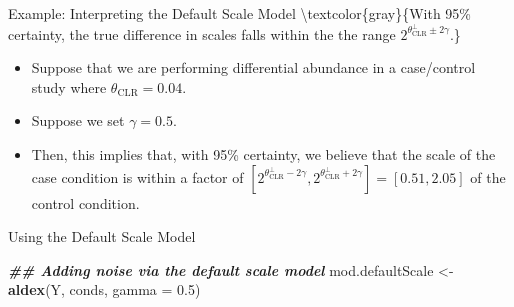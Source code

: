 \documentclass[
  ignorenonframetext,
]{beamer}
\newenvironment{Shaded}{\begin{snugshade}}{\end{snugshade}}
\newcommand{\AttributeTok}[1]{\textcolor[rgb]{0.13,0.29,0.53}{#1}}
\newcommand{\DocumentationTok}[1]{\textcolor[rgb]{0.56,0.35,0.01}{\textbf{\textit{#1}}}}
\newcommand{\FloatTok}[1]{\textcolor[rgb]{0.00,0.00,0.81}{#1}}
\newcommand{\FunctionTok}[1]{\textcolor[rgb]{0.13,0.29,0.53}{\textbf{#1}}}
\newcommand{\NormalTok}[1]{#1}
\newcommand{\OtherTok}[1]{\textcolor[rgb]{0.56,0.35,0.01}{#1}}
\providecommand{\tightlist}{%
  \setlength{\itemsep}{0pt}\setlength{\parskip}{0pt}}
\begin{document}
\begin{frame}{Example: Interpreting the Default Scale Model}
\protect\hypertarget{example-interpreting-the-default-scale-model}{}
\textbackslash textcolor\{gray\}\{With 95\% certainty, the true
difference in scales falls within the the range
\(2^{\theta_{\text{CLR}}^\perp \pm 2 \gamma}\).\}

\pause

\begin{itemize}
\tightlist
\item
  Suppose that we are performing differential abundance in a
  case/control study where \(\theta_{\text{CLR}} = 0.04\).
\end{itemize}

\pause

\begin{itemize}
\tightlist
\item
  Suppose we set \(\gamma = 0.5\).
\end{itemize}

\pause

\begin{itemize}
\tightlist
\item
  Then, this implies that, with 95\% certainty, we believe that the
  scale of the case condition is within a factor of
  \([2^{\theta_{\text{CLR}}^\perp - 2 \gamma}, 2^{\theta_{\text{CLR}}^\perp + 2 \gamma}] = [0.51,2.05]\)
  of the control condition.
\end{itemize}
\end{frame}

\begin{frame}[fragile]{Using the Default Scale Model}
\protect\hypertarget{using-the-default-scale-model}{}
\begin{Shaded}
\begin{Highlighting}[]
\DocumentationTok{\#\# Adding noise via the default scale model}
\NormalTok{mod.defaultScale }\OtherTok{\textless{}{-}} \FunctionTok{aldex}\NormalTok{(Y, conds, }\AttributeTok{gamma =} \FloatTok{0.5}\NormalTok{)}
\end{Highlighting}
\end{Shaded}
\end{frame}
\end{document}
